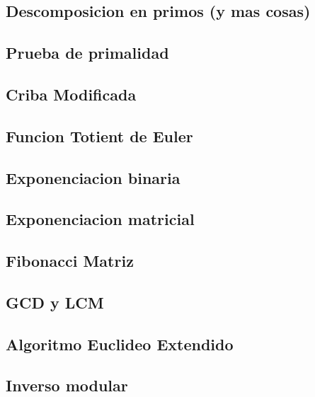 \subsection{Descomposicion en primos (y mas cosas)}
\raggedbottom
\hrulefill
\subsection{Prueba de primalidad}
\raggedbottom
\hrulefill
\subsection{Criba Modificada}
\raggedbottom
\hrulefill
\subsection{Funcion Totient de Euler}
\raggedbottom
\hrulefill
\subsection{Exponenciacion binaria}
\raggedbottom
\hrulefill
\subsection{Exponenciacion matricial}
\raggedbottom
\hrulefill
\subsection{Fibonacci Matriz}
\raggedbottom
\hrulefill
\subsection{GCD y LCM}
\raggedbottom
\hrulefill
\subsection{Algoritmo Euclideo Extendido}
\raggedbottom
\hrulefill
\subsection{Inverso modular}
\raggedbottom
\hrulefill
